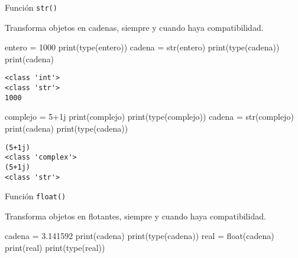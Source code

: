 \documentclass[
  letterpaper,
  DIV=11,
  numbers=noendperiod]{scrreprt}
\newenvironment{Shaded}{\begin{snugshade}}{\end{snugshade}}
\newcommand{\BuiltInTok}[1]{\textcolor[rgb]{0.00,0.23,0.31}{#1}}
\newcommand{\DecValTok}[1]{\textcolor[rgb]{0.68,0.00,0.00}{#1}}
\newcommand{\NormalTok}[1]{\textcolor[rgb]{0.00,0.23,0.31}{#1}}
\newcommand{\OperatorTok}[1]{\textcolor[rgb]{0.37,0.37,0.37}{#1}}
\newcommand{\OtherTok}[1]{\textcolor[rgb]{0.00,0.23,0.31}{#1}}
\newcommand{\StringTok}[1]{\textcolor[rgb]{0.13,0.47,0.30}{#1}}
\begin{document}
Función \texttt{str()}

Transforma objetos en cadenas, siempre y cuando haya compatibilidad.

\begin{Shaded}
\begin{Highlighting}[]
\NormalTok{entero }\OperatorTok{=} \DecValTok{1000}
\BuiltInTok{print}\NormalTok{(}\BuiltInTok{type}\NormalTok{(entero))}
\NormalTok{cadena }\OperatorTok{=} \BuiltInTok{str}\NormalTok{(entero) }
\BuiltInTok{print}\NormalTok{(}\BuiltInTok{type}\NormalTok{(cadena))}
\BuiltInTok{print}\NormalTok{(cadena)}
\end{Highlighting}
\end{Shaded}

\begin{verbatim}
<class 'int'>
<class 'str'>
1000
\end{verbatim}

\begin{Shaded}
\begin{Highlighting}[]
\NormalTok{complejo }\OperatorTok{=} \DecValTok{5}\OperatorTok{+}\OtherTok{1j}
\BuiltInTok{print}\NormalTok{(complejo)}
\BuiltInTok{print}\NormalTok{(}\BuiltInTok{type}\NormalTok{(complejo))}
\NormalTok{cadena }\OperatorTok{=} \BuiltInTok{str}\NormalTok{(complejo)}
\BuiltInTok{print}\NormalTok{(cadena)}
\BuiltInTok{print}\NormalTok{(}\BuiltInTok{type}\NormalTok{(cadena))}
\end{Highlighting}
\end{Shaded}

\begin{verbatim}
(5+1j)
<class 'complex'>
(5+1j)
<class 'str'>
\end{verbatim}

Función \texttt{float()}

Transforma objetos en flotantes, siempre y cuando haya compatibilidad.

\begin{Shaded}
\begin{Highlighting}[]
\NormalTok{cadena }\OperatorTok{=} \StringTok{\textquotesingle{}3.141592\textquotesingle{}}
\BuiltInTok{print}\NormalTok{(cadena)}
\BuiltInTok{print}\NormalTok{(}\BuiltInTok{type}\NormalTok{(cadena))}
\NormalTok{real }\OperatorTok{=} \BuiltInTok{float}\NormalTok{(cadena)}
\BuiltInTok{print}\NormalTok{(real)}
\BuiltInTok{print}\NormalTok{(}\BuiltInTok{type}\NormalTok{(real))}
\end{Highlighting}
\end{Shaded}
\end{document}
